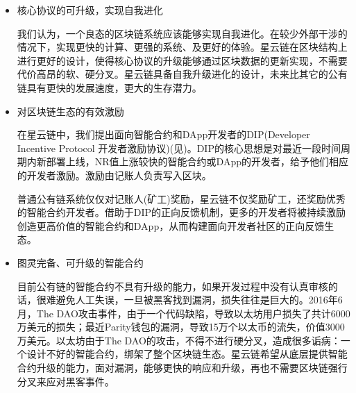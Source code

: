 \begin{itemize}
	\item 核心协议的可升级，实现自我进化

我们认为，一个良态的区块链系统应该能够实现自我进化。在较少外部干涉的情况下，实现更快的计算、更强的系统、及更好的体验。星云链在区块结构上进行更好的设计，使得核心协议的升级能够通过区块数据的更新实现，不需要代价高昂的软、硬分叉。星云链具备自我升级进化的设计，未来比其它的公有链具有更快的发展速度，更大的生存潜力。

	\item 对区块链生态的有效激励

在星云链中，我们提出面向智能合约和DApp开发者的DIP(Developer Incentive Protocol 开发者激励协议)(见)。DIP的核心思想是对最近一段时间周期内新部署上线，NR值上涨较快的智能合约或DApp的开发者，给予他们相应的开发者激励。激励由记账人负责写入区块。

普通公有链系统仅仅对记账人(矿工)奖励，星云链不仅奖励矿工，还奖励优秀的智能合约开发者。借助于DIP的正向反馈机制，更多的开发者将被持续激励创造更高价值的智能合约和DApp，从而构建面向开发者社区的正向反馈生态。

	\item 图灵完备、可升级的智能合约

目前公有链的智能合约不具有升级的能力，如果开发过程中没有认真审核的话，很难避免人工失误，一旦被黑客找到漏洞，损失往往是巨大的。2016年6月，The DAO攻击事件，由于一个代码缺陷，导致以太坊用户损失了共计6000万美元的损失；最近Parity钱包的漏洞，导致15万个以太币的流失，价值3000万美元。以太坊由于The DAO的攻击，不得不进行硬分叉，造成很多诟病：一个设计不好的智能合约，绑架了整个区块链生态。星云链希望从底层提供智能合约升级的能力，面对漏洞，能够更快的响应和升级，再也不需要区块链强行分叉来应对黑客事件。

\end{itemize}

